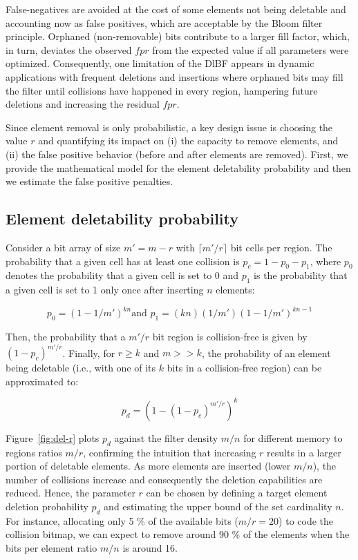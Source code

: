 \documentclass[conference]{IEEEtran}
\begin{document}
False-negatives are avoided at the cost of some elements not being deletable and accounting now as false positives, which are acceptable by the Bloom filter principle. Orphaned (non-removable) bits contribute to a larger fill factor, which, in turn, deviates the observed $fpr$ from the expected value if all parameters were optimized. 
Consequently, one limitation of the DlBF appears in dynamic applications with frequent deletions and insertions where orphaned bits may fill the filter until collisions have happened in every region, hampering future deletions and increasing the residual $fpr$. 



Since element removal is only probabilistic, a key design issue is choosing the value $r$ and quantifying its impact on (i) the capacity to remove elements, and (ii) the false positive behavior (before and after elements are removed).
First, we provide the mathematical model for the element deletability probability and then we estimate the false positive penalties.




\subsection{Element deletability probability}

Consider a bit array of size $m'=m-r$ with $\lceil m'/r \rceil$ bit cells per region.   
The probability that a given cell has at least one collision is $p_c = 1-p_0-p_1$, where
$p_0$ denotes the probability that a given cell is set to 0 and $p_1$ is the
probability that a given cell is set to 1 only once after inserting $n$ elements: \begin{footnotesize}
\begin{equation*}
  p_{0} = (1-1/m')^{kn} \textrm{and }  p_{1} = (kn)(1/m')(1-1/m')^{kn - 1}
\label{eq:p}
\end{equation*}
\end{footnotesize}
Then, the probability that a $m '/ r$ bit region is collision-free is given by $(1-p_c)^{m '/ r}$. 
Finally, for $r \geq k$ and $m>>k$, the probability of an element being deletable (i.e., with one of its $k$ bits in a collision-free region) can be approximated to:\begin{footnotesize}
\begin{equation}
  p_{d} = (1-(1-p_c)^{m '/ r})^k
\label{eq:pd}
\end{equation}
\end{footnotesize}
Figure~\ref{fig:del-r} plots $p_d$ against the filter density $m/n$ for different memory to regions ratios $m/r$, confirming the intuition that increasing $r$ results in a larger portion of deletable elements. As more elements are inserted (lower $m/n$), the number of collisions increase and consequently the deletion capabilities are reduced. 
Hence,  the parameter $r$ can be chosen by defining a target element deletion probability $p_d$ and estimating the upper bound of the set cardinality $n$. 
For instance, allocating only 5 \% of the available bits ($m/r=20$) to code the collision bitmap, we can expect to remove around 90 \% of the elements when the bits per element ratio $m/n$ is around 16. 
\end{document}
